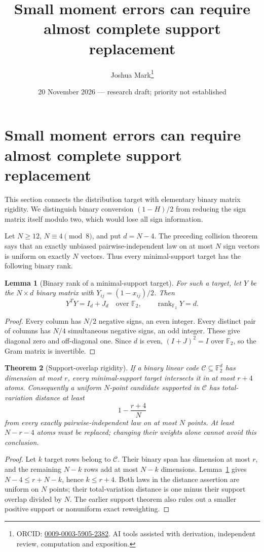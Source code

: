 \documentclass[11pt]{article}
\title{Small moment errors can require\\almost complete support replacement}
\author{Joshua Mark\thanks{ORCID: \href{https://orcid.org/0009-0003-5905-2382}{0009-0003-5905-2382}. AI tools assisted with derivation, independent review, computation and exposition.}}
\date{20 November 2026 --- research draft; priority not established}
\newtheorem{theorem}{Theorem}[section]
\newtheorem{lemma}[theorem]{Lemma}
\begin{document}
\maketitle
\section{Small moment errors can require almost complete support replacement}
\label{sec:rank-rounding}
This section connects the distribution target with elementary binary
matrix rigidity. We distinguish binary conversion $(1-H)/2$ from
reducing the sign matrix itself modulo two, which would lose all
sign information.

Let $N\ge12$, $N\equiv4\pmod8$, and put $d=N-4$. The preceding
collision theorem says that an exactly unbiased pairwise-independent
law on at most $N$ sign vectors is uniform on exactly $N$ vectors.
Thus every minimal-support target has the following binary rank.

\begin{lemma}[Binary rank of a minimal-support target]
\label{lem:rank-target}
For such a target, let $Y$ be the $N\times d$ binary matrix with
$Y_{ij}=(1-x_{ij})/2$. Then
\[
 Y^TY=I_d+J_d\quad\text{over }\mathbb F_2,
 \qquad \operatorname{rank}_{\mathbb F_2}Y=d.
\]
\end{lemma}
\begin{proof}
Every column has $N/2$ negative signs, an even integer. Every distinct
pair of columns has $N/4$ simultaneous negative signs, an odd integer.
These give diagonal zero and off-diagonal one. Since $d$ is even,
$(I+J)^2=I$ over $\mathbb F_2$, so the Gram matrix is invertible.
\end{proof}

\begin{theorem}[Support-overlap rigidity]\label{thm:rank-overlap}
If a binary linear code $\mathcal C\subseteq\mathbb F_2^d$ has
dimension at most $r$, every minimal-support target intersects it in
at most $r+4$ atoms. Consequently a uniform $N$-point candidate
supported in $\mathcal C$ has total-variation distance at least
\[
 1-\frac{r+4}{N}
\]
from every exactly pairwise-independent law on at most $N$ points.
At least $N-r-4$ atoms must be replaced; changing their weights alone
cannot avoid this conclusion.
\end{theorem}
\begin{proof}
Let $k$ target rows belong to $\mathcal C$. Their binary span has
dimension at most $r$, and the remaining $N-k$ rows add at most
$N-k$ dimensions. Lemma~\ref{lem:rank-target} gives
$N-4\le r+N-k$, hence $k\le r+4$.
Both laws in the distance assertion are uniform on $N$ points;
their total-variation distance is one minus their support overlap
divided by $N$. The earlier support theorem also rules out a smaller
positive support or nonuniform exact reweighting.
\end{proof}
\end{document}
